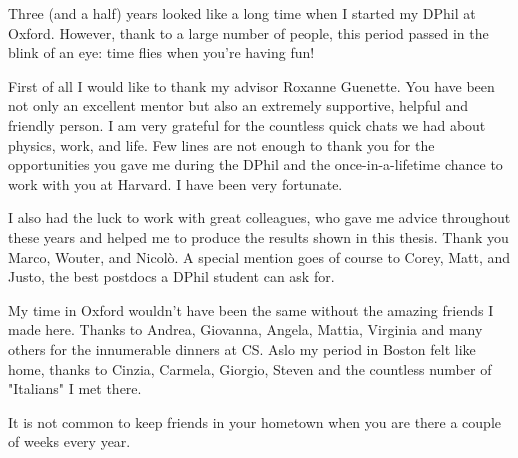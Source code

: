 Three (and a half) years looked like a long time when I started my DPhil at Oxford. However, thank to a large number of people, this period passed in the blink of an eye: time flies when you're having fun!

First of all I would like to thank my advisor Roxanne Guenette. You have been not only an excellent mentor but also an extremely supportive, helpful and friendly person. I am very grateful for the countless quick chats we had about physics, work, and life. Few lines are not enough to thank you for the opportunities you gave me during the DPhil and the once-in-a-lifetime chance to work with you at Harvard. I have been very fortunate.

I also had the luck to work with great colleagues, who gave me advice throughout these years and helped me to produce the results shown in this thesis. Thank you Marco, Wouter, and Nicolò. A special mention goes of course to Corey, Matt, and Justo, the best postdocs a DPhil student can ask for.

My time in Oxford wouldn't have been the same without the amazing friends I made here. Thanks to Andrea, Giovanna, Angela, Mattia, Virginia and many others for the innumerable dinners at CS.
Aslo my period in Boston felt like home, thanks to Cinzia, Carmela, Giorgio, Steven and the countless number of "Italians" I met there. 

It is not common to keep friends in your hometown when you are there a couple of weeks every year.